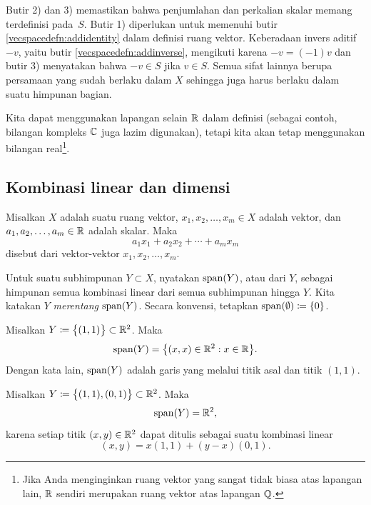 Butir 2) dan 3)
memastikan bahwa penjumlahan dan perkalian skalar memang terdefinisi pada~$S$.
Butir 1) diperlukan
untuk memenuhi butir \ref{vecspacedefn:addidentity} dalam definisi ruang
vektor.  Keberadaan
invers aditif $-v$, yaitu butir \ref{vecspacedefn:addinverse},
mengikuti karena $-v = (-1)v$ dan butir 3) menyatakan bahwa
$-v \in S$ jika $v \in S$.  Semua sifat lainnya berupa persamaan
yang sudah berlaku dalam $X$ sehingga juga harus berlaku dalam suatu himpunan bagian.

\medskip

Kita dapat menggunakan lapangan selain ${\mathbb{R}}$ dalam definisi
(sebagai contoh, bilangan kompleks ${\mathbb{C}}$ juga lazim digunakan),
tetapi kita akan tetap menggunakan
bilangan real\footnote{Jika Anda menginginkan ruang vektor yang sangat tidak biasa atas lapangan lain,
${\mathbb{R}}$ sendiri merupakan ruang vektor atas lapangan ${\mathbb{Q}}$.}.

\subsection{Kombinasi linear dan dimensi}

\begin{defn}
Misalkan $X$ adalah suatu ruang vektor,
$x_1, x_2, \ldots, x_m \in X$ adalah vektor, dan
$a_1, a_2, \ldots, a_m \in {\mathbb{R}}$ adalah skalar.  Maka
\begin{equation*}
a_1 x_1 + 
a_2 x_2 +  \cdots
+ a_m x_m
\end{equation*}
disebut \emph{} dari vektor-vektor $x_1, x_2,
\ldots, x_m$.

Untuk suatu subhimpunan $Y \subset X$, nyatakan $\operatorname{span}(Y)$,
atau \emph{} dari $Y$,
sebagai himpunan semua kombinasi linear dari semua subhimpunan hingga $Y$.
Kita katakan $Y$ \emph{merentang} $\operatorname{span}(Y)$.
Secara konvensi, tetapkan $\operatorname{span}(\emptyset) \coloneqq \{ 0 \}$.
\end{defn}

\begin{example}
Misalkan $Y \coloneqq \bigl\{ (1,1) \bigr\} \subset {\mathbb{R}}^2$.  Maka
\begin{equation*}
\operatorname{span}(Y)
=
\bigl\{ (x,x) \in {\mathbb{R}}^2 : x \in {\mathbb{R}} \bigr\} .
\end{equation*}
Dengan kata lain, $\operatorname{span}(Y)$ adalah garis yang melalui titik asal dan titik $(1,1)$.
\end{example}

\begin{example} \label{example:vecspr2span}
Misalkan $Y \coloneqq \bigl\{ (1,1), (0,1) \bigr\} \subset {\mathbb{R}}^2$.  Maka
\begin{equation*}
\operatorname{span}(Y)
=
{\mathbb{R}}^2 ,
\end{equation*}
karena setiap titik $(x,y) \in {\mathbb{R}}^2$ dapat ditulis sebagai
suatu kombinasi linear
\begin{equation*}
(x,y) = x (1,1) + (y-x) (0,1) .
\end{equation*}
\end{example}

